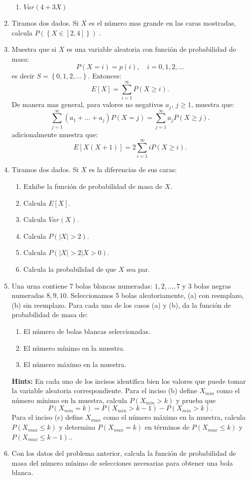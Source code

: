 \documentclass{article}
\begin{document}
\begin{enumerate}
\begin{enumerate}
          \item $Var\left(4+3X\right)$
        \end{enumerate}
  \item Tiramos dos dados. Si $X$ es el número mas grande en las caras mostradas, calcula $P\left(\left\{X\in[2,4]\right\}\right)$ .
  \item Muestra que si $X$ es una variable aleatoria con función de probabilidad de masa:
        $$
          P(X =i) = p(i), \quad i = 0, 1, 2,\ldots
        $$
        es decir $S = \left\{0, 1, 2, \ldots\right\}$. Entonces:
        $$
          E[X] = \sum_{i=1}^\infty P(X\geq i).
        $$
        De manera mas general, para valores no negativos $a_j$, $j\geq 1$, muestra que:
        $$
        \sum_{j=1}^\infty(a_1+\ldots + a_j)P(X=j) = \sum_{j=1}^\infty a_jP(X\geq j).
        $$
        adicionalmente muestra que:
        $$
        E[X(X+1)] = 2\sum_{i=1}^\infty iP(X\geq i).
        $$

  \item Tiramos dos dados. Si $X$ es la diferencias de sus caras:
        \begin{enumerate}
          \item Exhibe la función de probabilidad de masa de $X$.
          \item Calcula $E\left[X\right]$.
          \item Calcula $Var\left(X\right)$.
          \item Calcula $P(\vert X\vert > 2)$.
          \item Calcula $P(\vert X\vert > 2\vert X>0)$.
          \item Calcula la probabilidad de que $X$ sea par.
        \end{enumerate}
  \item Una urna contiene 7 bolas blancas numeradas: $1,2,\ldots, 7$ y 3 bolas negras numeradas $8,9,10$. Seleccionamos 5 bolas aleatoriamente, (a) con reemplazo, (b) sin reemplazo. Para cada uno de los casos (a) y (b), da la función de probabilidad de masa de:
        \begin{enumerate}
          \item El número de bolas blancas seleccionadas.
          \item El número mínimo en la muestra.
          \item El número máximo en la muestra.
        \end{enumerate}
        \textbf{Hints:} En cada uno de los incisos identifica bien los valores que puede tomar la variable aleatoria correspondiente. Para el inciso (b) define $X_{min}$ como el número mínimo en la muestra, calcula $P(X_{min} > k)$ y prueba que 
        $$
        P(X_{min} = k) = P(X_{min} > k-1) - P(X_{min} > k).
        $$
        Para el inciso (c) define $X_{max}$ como el número máximo en la muestra, calcula $P(X_{max} \leq k)$ y determina $P(X_{max} = k)$ en términos de $P(X_{max} \leq k)$ y $P(X_{max} \leq k-1)$..
  \item Con los datos del problema anterior, calcula la función de probabilidad de masa del número mínimo de selecciones necesarias para obtener una bola blanca.
\end{enumerate}
\end{document}
